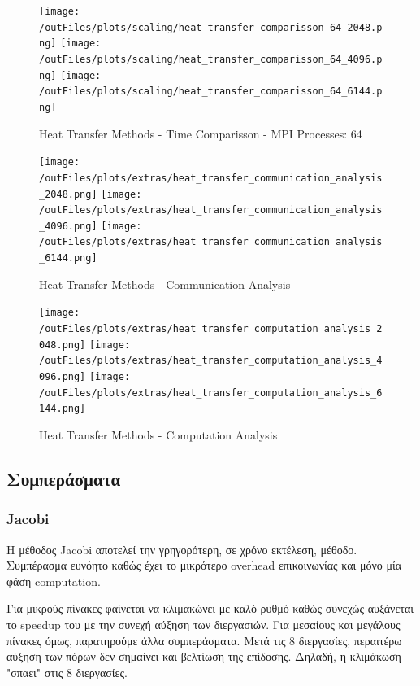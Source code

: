 \documentclass[../final_report.tex]{subfiles}
\begin{document}
\begin{figure}[H]
    \centering
    \texttt{[image: /outFiles/plots/scaling/heat\_transfer\_comparisson\_64\_2048.png]}
    \texttt{[image: /outFiles/plots/scaling/heat\_transfer\_comparisson\_64\_4096.png]}
    \texttt{[image: /outFiles/plots/scaling/heat\_transfer\_comparisson\_64\_6144.png]}
    \caption{Heat Transfer Methods - Time Comparisson - MPI Processes: 64}
    \label{fig:Heat Transfer Methods - Time Comparisson - MPI Processes: 64}
\end{figure}

\begin{figure}[H]
    \centering
    \texttt{[image: /outFiles/plots/extras/heat\_transfer\_communication\_analysis\_2048.png]}
    \texttt{[image: /outFiles/plots/extras/heat\_transfer\_communication\_analysis\_4096.png]}
    \texttt{[image: /outFiles/plots/extras/heat\_transfer\_communication\_analysis\_6144.png]}
    \caption{Heat Transfer Methods - Communication Analysis}
    \label{fig:Heat Transfer Methods - Communication Analysis}
\end{figure}

\begin{figure}[H]
    \centering
    \texttt{[image: /outFiles/plots/extras/heat\_transfer\_computation\_analysis\_2048.png]}
    \texttt{[image: /outFiles/plots/extras/heat\_transfer\_computation\_analysis\_4096.png]}
    \texttt{[image: /outFiles/plots/extras/heat\_transfer\_computation\_analysis\_6144.png]}
    \caption{Heat Transfer Methods - Computation Analysis}
    \label{fig:Heat Transfer Methods - Computation Analysis}
\end{figure}

\subsection*{Συμπεράσματα}

\subsubsection*{Jacobi}
Η μέθοδος Jacobi αποτελεί την γρηγορότερη, σε χρόνο εκτέλεση, μέθοδο. Συμπέρασμα ευνόητο καθώς έχει το μικρότερο overhead
επικοινωνίας και μόνο μία φάση computation.

Για μικρούς πίνακες φαίνεται να κλιμακώνει με καλό ρυθμό καθώς συνεχώς αυξάνεται
το speedup του με την συνεχή αύξηση των διεργασιών. Για μεσαίους και μεγάλους πίνακες όμως, παρατηρούμε άλλα συμπεράσματα. Μετά τις
8 διεργασίες, περαιτέρω αύξηση των πόρων δεν σημαίνει και βελτίωση της επίδοσης. Δηλαδή, η κλιμάκωση "σπαει" στις 8 διεργασίες.
\end{document}
